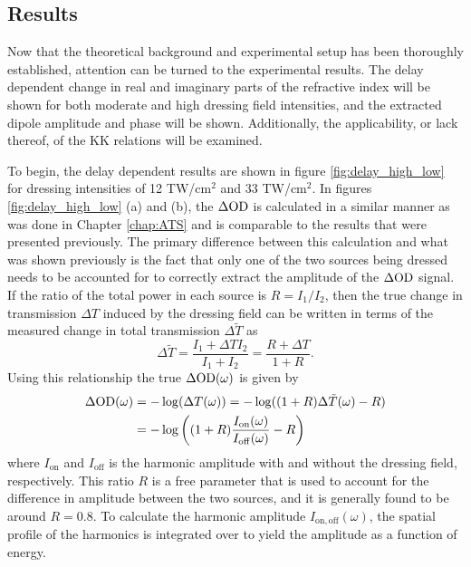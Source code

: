 \subsection{Results}
\label{sec:CATS_ar_results}

Now that the theoretical background and experimental setup has been thoroughly established, attention can be turned to the experimental results.  The delay dependent change in real and imaginary parts of the refractive index will be shown for both moderate and high dressing field intensities, and the extracted dipole amplitude and phase will be shown. Additionally, the applicability, or lack thereof, of the KK relations will be examined.

To begin, the delay dependent results are shown in figure \ref{fig:delay_high_low} for dressing intensities of 12 TW/cm$^2$ and 33 TW/cm$^2$. In figures \ref{fig:delay_high_low} (a) and (b), the $\Delta\mathrm{OD}$ is calculated in a similar manner as was done in Chapter \ref{chap:ATS}  and is comparable to the results that were presented previously. The primary difference between this calculation and what was shown previously is the fact that only one of the two sources being dressed needs to be accounted for to correctly extract the amplitude of the $\Delta\mathrm{OD}$ signal.  If the ratio of the total power in each source is $R=I_1/I_2$, then the true change in transmission $\Delta T$ induced by the dressing field can be written in terms of the measured change in total transmission $\Delta \tilde{T}$ as
\begin{equation}
	\label{eqn:dod_fringe_shift}
	\Delta \tilde{T} = \frac{I_1 + \Delta T I_2}{I_1 + I_2} = \frac{R + \Delta T}{1+ R}.
\end{equation}
Using this relationship the true $\Delta\mathrm{OD}(\omega)$ is given by 
\begin{equation}
	\label{eqn:dod_R}
	\begin{aligned}
		\Delta\mathrm{OD}(\omega) & = -\log(\Delta T(\omega)) = -\log((1+R)\Delta \tilde{T}(\omega) - R) \\
		&= -\log\bigg((1+R)\frac{I_{\mathrm{on}}(\omega)}{I_{\mathrm{off}}(\omega)} - R\bigg)
	\end{aligned}
\end{equation}
where $I_{\mathrm{on}}$ and $I_{\mathrm{off}}$ is the harmonic amplitude with and without the dressing field, respectively.  This ratio $R$ is a free parameter that is used to account for the difference in amplitude between the two sources, and it is generally found to be around $R=0.8$.  To calculate the harmonic amplitude $I_{\mathrm{on,off}}(\omega)$, the spatial profile of the harmonics is integrated over to yield the amplitude as a function of energy.

